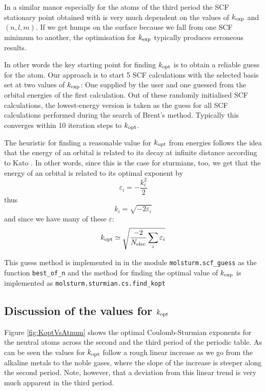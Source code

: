 In a similar manor especially for the atoms of the third
period the SCF stationary point obtained with \molsturm
is very much dependent on the values of $k_\text{exp}$ and $(n,l,m)$.
If we get humps on the surface because we fall from one SCF
minimum to another,
the optimisation for $k_\text{exp}$ typically produces erroneous results.

In other words the key starting point for finding $k_\text{opt}$
is to obtain a reliable guess for the atom.
Our approach is to start 5 SCF calculations with the
selected \CS basis set at two values of $k_\text{exp}$:
One supplied by the user and one guessed from the \HF orbital
energies of the first calculation.
Out of these randomly initialised SCF calculations,
the lowest-energy version is taken as the guess
for all SCF calculations performed during the search
of Brent's method.
Typically this converges within 10 iteration steps
to $k_\text{opt}$.

The heuristic for finding a reasonable value for
$k_\text{opt}$ from \HF energies follows the idea that the
energy of an orbital is related to its decay at infinite distance
according to Kato
.
In other words, since this is the case for sturmians, too,
we get that the energy of an orbital is related to its optimal
exponent by
\[
	\varepsilon_i = -\frac{k_i^2}{2}
\]
thus
\[
	k_i = \sqrt{-2 \varepsilon_i}
\]
and since we have many of these $\varepsilon$:
\[
	k_\text{opt} \simeq \sqrt{\frac{-2}{N_\text{elec}} \sum_i \varepsilon_i}
\]

This guess method is implemented in \molsturm in the
module \texttt{molsturm.scf\_guess}
as the function \texttt{best\_of\_n} and the method
for finding the optimal value of $k_\text{exp}$ is implemented
as \texttt{molsturm.sturmian.cs.find\_kopt}

\subsection{Discussion of the values for $k_\text{opt}$}
\label{sec:ValuesKopt}

Figure \vref{fig:KoptVsAtnum} shows the optimal Coulomb-Sturmian exponents
for the neutral atoms across the second and the third period of the periodic table.
As can be seen the values for $k_\text{opt}$ follow a rough linear increase
as we go from the alkaline metals to the noble gases,
where the slope of the increase is steeper along the second period.
Note, however, that a deviation from this linear trend
is very much apparent in the third period.

